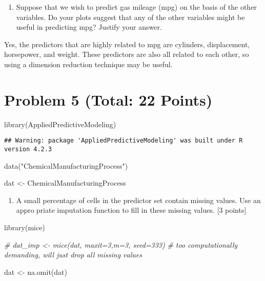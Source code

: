 \documentclass[
]{article}
\newenvironment{Shaded}{\begin{snugshade}}{\end{snugshade}}
\newcommand{\CommentTok}[1]{\textcolor[rgb]{0.56,0.35,0.01}{\textit{#1}}}
\newcommand{\FunctionTok}[1]{\textcolor[rgb]{0.00,0.00,0.00}{#1}}
\newcommand{\NormalTok}[1]{#1}
\newcommand{\OtherTok}[1]{\textcolor[rgb]{0.56,0.35,0.01}{#1}}
\newcommand{\StringTok}[1]{\textcolor[rgb]{0.31,0.60,0.02}{#1}}
\providecommand{\tightlist}{%
  \setlength{\itemsep}{0pt}\setlength{\parskip}{0pt}}
\begin{document}
\begin{enumerate}
\def\labelenumi{(\alph{enumi})}
\setcounter{enumi}{5}
\tightlist
\item
  Suppose that we wish to predict gas mileage (mpg) on the basis of the
  other variables. Do your plots suggest that any of the other variables
  might be useful in predicting mpg? Justify your answer.
\end{enumerate}

Yes, the predictors that are highly related to mpg are cylinders,
displacement, horsepower, and weight. These predictors are also all
related to each other, so using a dimension reduction technique may be
useful.

\hypertarget{problem-5-total-22-points}{%
\section{Problem 5 (Total: 22 Points)}\label{problem-5-total-22-points}}

\begin{Shaded}
\begin{Highlighting}[]
\FunctionTok{library}\NormalTok{(AppliedPredictiveModeling)}
\end{Highlighting}
\end{Shaded}

\begin{verbatim}
## Warning: package 'AppliedPredictiveModeling' was built under R version 4.2.3
\end{verbatim}

\begin{Shaded}
\begin{Highlighting}[]
\FunctionTok{data}\NormalTok{(}\StringTok{"ChemicalManufacturingProcess"}\NormalTok{)}

\NormalTok{dat }\OtherTok{\textless{}{-}}\NormalTok{ ChemicalManufacturingProcess}
\end{Highlighting}
\end{Shaded}

\begin{enumerate}
\def\labelenumi{(\alph{enumi})}
\tightlist
\item
  A small percentage of cells in the predictor set contain missing
  values. Use an appropriate imputation function to fill in these
  missing values. {[}3 points{]}
\end{enumerate}

\begin{Shaded}
\begin{Highlighting}[]
\FunctionTok{library}\NormalTok{(mice)}

\CommentTok{\# dat\_imp \textless{}{-} mice(dat, maxit=3,m=3, seed=333) }
\CommentTok{\# too computationally demanding, will just drop all missing values }

\NormalTok{dat }\OtherTok{\textless{}{-}} \FunctionTok{na.omit}\NormalTok{(dat)}
\end{Highlighting}
\end{Shaded}
\end{document}
